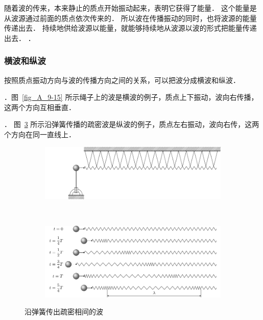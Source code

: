 
随着波的传来，本来静止的质点开始振动起来，表明它获得了能量．
这个能量是从波源通过前面的质点依次传来的．
所以波在传播振动的同时，也将波源的能量传递出去．
持续地供给波源以能量，就能够持续地从波源以波的形式把能量传递出去．
．

\subsubsection{横波和纵波} 

按照质点振动方向与波的传播方向之间的关系，可以把波分成横波和纵波．

．图~\ref{fig_A_9-15} 所示绳子上的波是横波的例子，质点上下振动，波向右传播，这两个方向互相垂直．

．
图~\ref{fig_A_9-16} 所示沿弹簧传播的疏密波是纵波的例子，质点左右振动，波向右传，这两个方向在同一直线上．
\begin{figure}[htbp]
    \centering
    \begin{subfigure}{0.8\linewidth}
    	\centering
    	\includegraphics{fig/A/9-16a.pdf}
    	\caption{}\label{fig_A_9-16a}
    \end{subfigure}
    \\
    \begin{subfigure}{0.8\linewidth}
    	\centering
    	\includegraphics{fig/A/9-16b.pdf}
    	\caption{}\label{fig_A_9-16b}
    \end{subfigure}
    \caption{沿弹簧传出疏密相间的波}\label{fig_A_9-16}
\end{figure}



